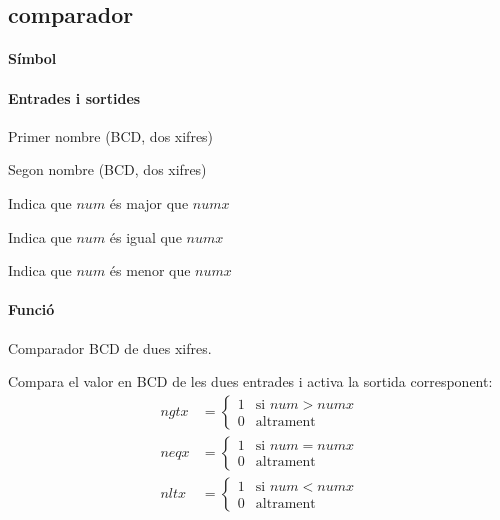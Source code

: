 \subsection{\label{sub:\projectname-comparador} \textsf{comparador}}

\paragraph{Símbol}

\begin{center}  \end{center}

\paragraph{Entrades i sortides}

\begin{where}
\item[\nodenamerange{numx}{7}{0}] Primer nombre (BCD, dos xifres)
\item[\nodenamerange{num}{7}{0}] Segon nombre (BCD, dos xifres)
\item[\nodenamebit{ngtx}] Indica que $num$ és major que $numx$
\item[\nodenamebit{neqx}] Indica que $num$ és igual que $numx$
\item[\nodenamebit{nltx}] Indica que $num$ és menor que $numx$
\end{where}

\paragraph{Funció}

Comparador BCD de dues xifres.

Compara el valor en BCD de les dues entrades i activa la sortida corresponent:
%
\begin{align*}
  ngtx &= \begin{cases}
    1 & \text{si $num > numx$} \\
    0 & \text{altrament}
  \end{cases} \\
  neqx &= \begin{cases}
    1 & \text{si $num = numx$} \\
    0 & \text{altrament}
  \end{cases} \\
  nltx &= \begin{cases}
    1 & \text{si $num < numx$} \\
    0 & \text{altrament}
  \end{cases}
\end{align*}

